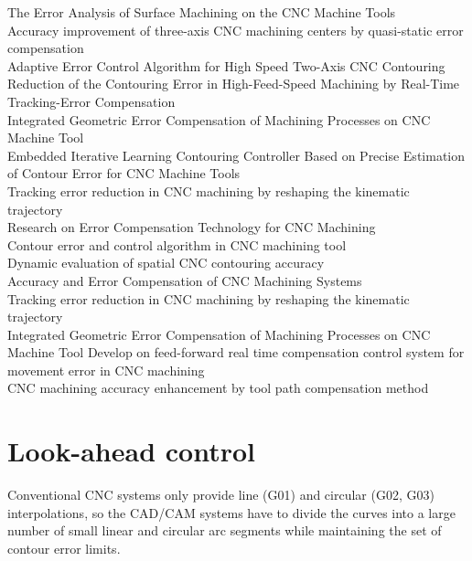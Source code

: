 \begin{tcolorbox}
	
	
\cite{Zheng_2014} The Error Analysis of Surface Machining on the {CNC} Machine Tools\\
\cite{Chen_1997} Accuracy improvement of three-axis CNC machining centers by quasi-static error compensation\\
\cite{Dong_2013} Adaptive Error Control Algorithm for High Speed Two-Axis {CNC} Contouring\\
\cite{Ma_2017}	Reduction of the Contouring Error in High-Feed-Speed Machining by Real-Time Tracking-Error Compensation\\
\cite{Zuo_2013}	Integrated Geometric Error Compensation of Machining Processes on CNC Machine Tool\\
\cite{Hendrawan_2018} Embedded Iterative Learning Contouring Controller Based on Precise Estimation of Contour Error for CNC Machine Tools\\	
\cite{Guo_2013} Tracking error reduction in CNC machining by reshaping the kinematic trajectory\\
\cite{Chen_2017} Research on Error Compensation Technology for CNC Machining\\
\cite{Wang_2012} Contour error and control algorithm in CNC machining tool\\	
\cite{Schmitz_2000} Dynamic evaluation of spatial CNC contouring accuracy\\
\cite{ErrorBook_2016} Accuracy and Error Compensation of CNC Machining Systems\\
\cite{Guo_2013} Tracking error reduction in CNC machining by reshaping the kinematic trajectory\\
\cite{Zuo_2013} Integrated Geometric Error Compensation of Machining Processes on CNC Machine Tool
\cite{Weihua_Li_2010} Develop on feed-forward real time compensation control system for movement error in CNC machining\\
\cite{Lau_MSThesis_2005} CNC machining accuracy enhancement by tool path compensation method\\


\end{tcolorbox}


\section{Look-ahead control}

Conventional CNC systems only provide line (G01) and circular (G02, G03) interpolations, so the CAD/CAM systems have to divide the curves into a large number of small linear and circular arc segments while maintaining the set of contour error limits. 
\vspace*{1\baselineskip}

